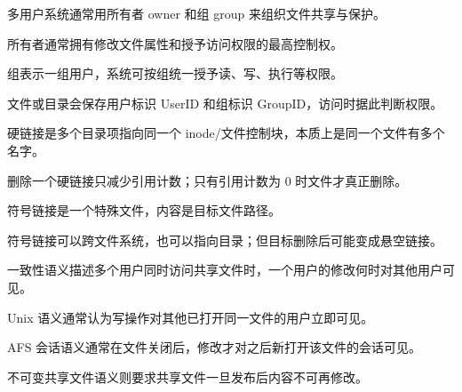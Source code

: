 \begin{points}
  \item 多用户系统通常用所有者 owner 和组 group 来组织文件共享与保护。
  \item 所有者通常拥有修改文件属性和授予访问权限的最高控制权。
  \item 组表示一组用户，系统可按组统一授予读、写、执行等权限。
  \item 文件或目录会保存用户标识 UserID 和组标识 GroupID，访问时据此判断权限。
\end{points}


\begin{points}
  \item 硬链接是多个目录项指向同一个 inode/文件控制块，本质上是同一个文件有多个名字。
  \item 删除一个硬链接只减少引用计数；只有引用计数为 0 时文件才真正删除。
  \item 符号链接是一个特殊文件，内容是目标文件路径。
  \item 符号链接可以跨文件系统，也可以指向目录；但目标删除后可能变成悬空链接。
\end{points}


\begin{points}
  \item 一致性语义描述多个用户同时访问共享文件时，一个用户的修改何时对其他用户可见。
  \item Unix 语义通常认为写操作对其他已打开同一文件的用户立即可见。
  \item AFS 会话语义通常在文件关闭后，修改才对之后新打开该文件的会话可见。
  \item 不可变共享文件语义则要求共享文件一旦发布后内容不可再修改。
\end{points}


